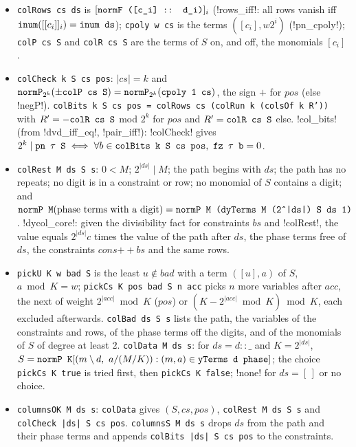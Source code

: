 \begin{itemize}
  set (\lean!pn_halves!, \lean!cval_colsOf!: $\textnormal{\texttt{cval (colsOf k T)}}\equiv\textnormal{\texttt{pn T}}\pmod{2^k}$).
\item \textnormal{\texttt{colRows cs ds}} is $[\textnormal{\texttt{normF ([c\_i] :: d\_i)}}]_i$ (\lean!rows_iff!: all rows vanish iff
  $\textnormal{\texttt{inum}}([[c_i]]_i)=\textnormal{\texttt{inum ds}}$); \textnormal{\texttt{cpoly w cs}} is the terms $([c_i],w2^i)$
  (\lean!pn_cpoly!); \textnormal{\texttt{colP cs S}} and \textnormal{\texttt{colR cs S}} are the terms of $S$ on, and off,
  the monomials $[c_i]$.
\item \textnormal{\texttt{colCheck k S cs pos}}: $|cs|=k$ and
  $\textnormal{\texttt{normP}}_{2^k}(\pm\textnormal{\texttt{colP cs S}}) = \textnormal{\texttt{normP}}_{2^k}(\textnormal{\texttt{cpoly 1 cs}})$, the sign $+$
  for $pos$ (else \lean!negP!).
  \textnormal{\texttt{colBits k S cs pos = colRows cs (colRun k (colsOf k R'))}} with $R'=-\textnormal{\texttt{colR cs S}}$ mod $2^k$
  for $pos$ and $R'=\textnormal{\texttt{colR cs S}}$ else.
  \lean!col_bits! (from \lean!dvd_iff_eq!, \lean!pair_iff!): \lean!colCheck! gives
  $2^k\mid\textnormal{\texttt{pn \ensuremath{\tau} S}}\iff\forall b\in\textnormal{\texttt{colBits k S cs pos}},\ \textnormal{\texttt{fz \ensuremath{\tau} b}}=0$.
\item \textnormal{\texttt{colRest M ds S s}}: $0<M$; $2^{|ds|}\mid M$; the path begins with $ds$; the path has no
  repeats; no digit is in a constraint or row; no monomial of $S$ contains a digit; and
  $\textnormal{\texttt{normP M}}(\text{phase terms with a digit}) = \textnormal{\texttt{normP M (dyTerms M (2\^{}|ds|) S ds 1)}}$.
  \lean!dycol_core!: given the divisibility fact for constraints $bs$ and \lean!colRest!, the value equals
  $2^{|ds|}c$ times the value of the path after $ds$, the phase terms free of $ds$, the constraints
  $cons\mathbin{+\!\!+}bs$ and the same rows.
\item \textnormal{\texttt{pickU K w bad S}} is the least $u\notin bad$ with a term $([u],a)$ of $S$, $a\bmod K=w$;
  \textnormal{\texttt{pickCs K pos bad S n acc}} picks $n$ more variables after $acc$, the next of weight
  $2^{|acc|}\bmod K$ ($pos$) or $(K-2^{|acc|}\bmod K)\bmod K$, each excluded afterwards.
  \textnormal{\texttt{colBad ds S s}} lists the path, the variables of the constraints and rows, of the phase
  terms off the digits, and of the monomials of $S$ of degree at least $2$.
  \textnormal{\texttt{colData M ds s}}: for $ds=d::\_$ and $K=2^{|ds|}$,
  $S=\textnormal{\texttt{normP K}}[(m\setminus d,\ a/(M/K)) : (m,a)\in\textnormal{\texttt{yTerms d phase}}]$; the choice
  \textnormal{\texttt{pickCs K true}} is tried first, then \textnormal{\texttt{pickCs K false}}; \lean!none! for $ds=[\,]$ or no
  choice.
\item \textnormal{\texttt{columnsOK M ds s}}: \textnormal{\texttt{colData}} gives $(S,cs,pos)$, \textnormal{\texttt{colRest M ds S s}} and
  \textnormal{\texttt{colCheck |ds| S cs pos}}. \textnormal{\texttt{columnsS M ds s}} drops $ds$ from the path and their phase
  terms and appends \textnormal{\texttt{colBits |ds| S cs pos}} to the constraints.
\end{itemize}
